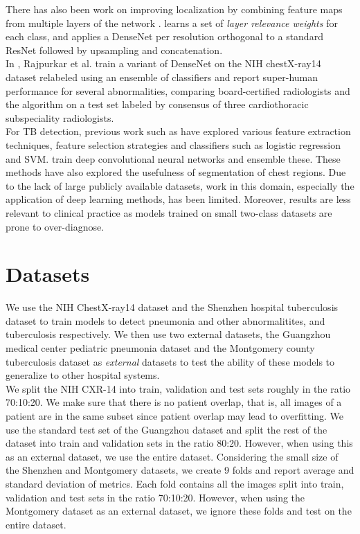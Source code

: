\documentclass[oneside,a4paper]{article}
\begin{document}
There has also been work on improving localization by combining feature maps
from multiple layers of the network \cite{Yao2018a,Sedai2018}. \cite{Sedai2018}
learns a set of \emph{layer relevance weights} for each class, and
\cite{Yao2018a} applies a DenseNet per resolution orthogonal to a standard
ResNet followed by upsampling and concatenation.\\

In \cite{Rajpurkar2018}, Rajpurkar et al. train a variant of DenseNet on the NIH chestX-ray14 dataset relabeled using an ensemble of classifiers and report
super-human performance for several abnormalities, comparing board-certified
radiologists and the algorithm on a test set labeled by consensus of three
cardiothoracic subspeciality radiologists.\\

For TB detection, previous work such as \cite{Jaeger2014,Lopes2017,Vajda2018}
have explored various feature extraction techniques, feature selection
strategies and classifiers such as logistic regression and SVM.
\cite{Hwang2016,Islam2017,Haloi2018a,Liu2018} train deep convolutional neural
networks and ensemble these. These methods have also explored the usefulness of
segmentation of chest regions. Due to the lack of large publicly available
datasets, work in this domain, especially the application of deep learning
methods, has been limited. Moreover, results are less relevant to clinical
practice as models trained on small two-class datasets are prone to over-diagnose.\\

\section{Datasets}
We use the NIH ChestX-ray14 dataset\cite{Wang2017} and the Shenzhen hospital
tuberculosis dataset\cite{jaeger2014two} to train models to detect pneumonia and other abnormalitites, and tuberculosis respectively. We then use two external
datasets, the Guangzhou medical center pediatric pneumonia
dataset\cite{kermany2018identifying} and the Montgomery county tuberculosis
dataset\cite{jaeger2014two} as \emph{external} datasets to test the ability of
these models to generalize to other hospital systems.\\

We split the NIH CXR-14 into train, validation and test sets roughly in the ratio
70:10:20. We make sure that there is no patient overlap, that is, all images of
a patient are in the same subset since patient overlap may lead to overfitting. We use the standard test set of the Guangzhou dataset and split the rest of the dataset into train and
validation sets in the ratio 80:20. However, when using this as an external dataset, we use the entire dataset. Considering the small size of the Shenzhen and Montgomery datasets, we create 9 folds and
report average and standard deviation of metrics. Each fold contains all the
images split into train, validation and test sets in the ratio 70:10:20. However, when using the Montgomery dataset as an
external dataset, we ignore these folds and test on the
entire dataset.
\end{document}
